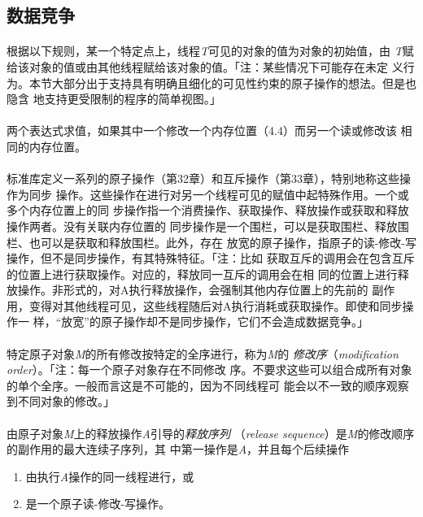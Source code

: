 \subsection{数据竞争}
\paragraph{}
根据以下规则，某一个特定点上，线程\textit{T}可见的对象的值为对象的初始值，由
\textit{T}赋给该对象的值或由其他线程赋给该对象的值。「注：某些情况下可能存在未定
义行为。本节大部分出于支持具有明确且细化的可见性约束的原子操作的想法。但是也隐含
地支持更受限制的程序的简单视图。」

\paragraph{}
两个表达式求值，如果其中一个修改一个内存位置（4.4）而另一个读或修改该
相同的内存位置。

\paragraph{}
标准库定义一系列的原子操作（第32章）和互斥操作（第33章），特别地称这些操作为同步
操作。这些操作在进行对另一个线程可见的赋值中起特殊作用。一个或多个内存位置上的同
步操作指一个消费操作、获取操作、释放操作或获取和释放操作两者。没有关联内存位置的
同步操作是一个围栏，可以是获取围栏、释放围栏、也可以是获取和释放围栏。此外，存在
放宽的原子操作，指原子的读-修改-写操作，但不是同步操作，有其特殊特征。「注：比如
获取互斥的调用会在包含互斥的位置上进行获取操作。对应的，释放同一互斥的调用会在相
同的位置上进行释放操作。非形式的，对A执行释放操作，会强制其他内存位置上的先前的
副作用，变得对其他线程可见，这些线程随后对A执行消耗或获取操作。即使和同步操作一
样，``放宽''的原子操作却不是同步操作，它们不会造成数据竞争。」

\paragraph{}
特定原子对象\textit{M}的所有修改按特定的全序进行，称为\textit{M}的
\textit{修改序}（\textit{modification order}）。「注：每一个原子对象存在不同修改
序。不要求这些可以组合成所有对象的单个全序。一般而言这是不可能的，因为不同线程可
能会以不一致的顺序观察到不同对象的修改。」

\paragraph{}
由原子对象\textit{M}上的释放操作\textit{A}引导的\textit{释放序列}
（\textit{release  sequence}）是\textit{M}的修改顺序的副作用的最大连续子序列，其
中第一操作是\textit{A}，并且每个后续操作
\begin{enumerate}
  \item{由执行\textit{A}操作的同一线程进行，或}
  \item{是一个原子读-修改-写操作。}
\end{enumerate}

